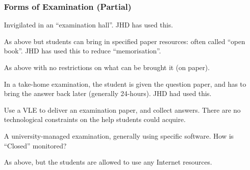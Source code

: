 \begin{frame}[fragile]
\frametitle{Forms of Examination (Partial)}
\pause
\begin{description}[<+->]
\item[Trad-C]Invigilated in an ``examination hall''. JHD has used this.%
\item[Trad-OR]As above but students can bring in specified paper resources: often called ``open book''. JHD has used this \cite{Betteridgeetal2019a} to reduce ``memorisation''.
\item[Trad-OU] As above with no restrictions on what can be brought it (on paper).
\item[TakeHome-OU]In a take-home examination, the student is given the question paper, and has to bring the answer back later (generally 24-hours). JHD had used this.
\item[Interim]Use a VLE to deliver an examination paper, and collect answers. There are no technological constraints on the help students could acquire.
\item[Electronic-C]A university-managed examination, generally using specific software. How is ``Closed'' monitored?
\item[Electronic-OU]As above, but the students are allowed to use any Internet resources. %
\end{description}
\end{frame}
